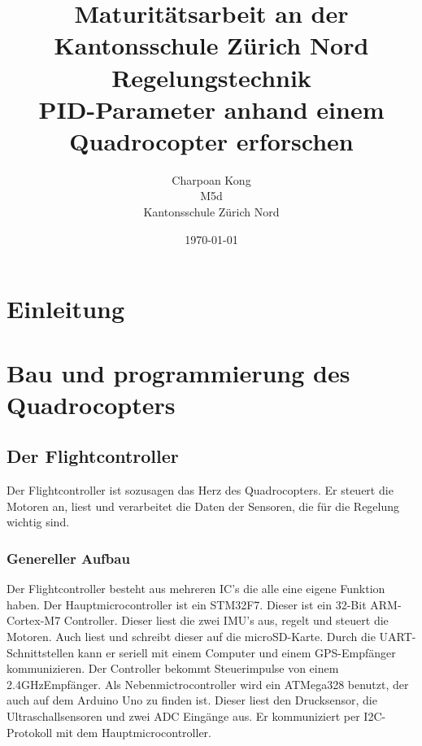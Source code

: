 \documentclass[12pt,a4paper, ngerman]{article}
\begin{document}

\title{\large Maturitätsarbeit an der Kantonsschule Zürich Nord \\ \Huge Regelungstechnik \\ \huge PID-Parameter anhand einem Quadrocopter erforschen}
\date{\today}
\author{Charpoan Kong \\ M5d \\ Kantonsschule Zürich Nord}
\maketitle
{}

\newpage
\clearpage
{}
\tableofcontents
\newpage
{}

\section{Einleitung}

\newpage
\section{Bau und programmierung des Quadrocopters}
\subsection{Der Flightcontroller}
Der Flightcontroller ist sozusagen das Herz des Quadrocopters. Er steuert die Motoren an, liest und verarbeitet die Daten der Sensoren, die für die Regelung wichtig sind.
\subsubsection{Genereller Aufbau}
Der Flightcontroller besteht aus mehreren IC's die alle eine eigene Funktion haben. Der Hauptmicrocontroller ist ein STM32F7. Dieser ist ein 32-Bit ARM-Cortex-M7 Controller. Dieser liest die zwei IMU's aus, regelt und steuert die Motoren. Auch liest und schreibt dieser auf die microSD-Karte. Durch die UART-Schnittstellen kann er seriell mit einem Computer und einem GPS-Empfänger kommunizieren. Der Controller bekommt Steuerimpulse von einem 2.4GHzEmpfänger. Als Nebenmictrocontroller wird ein ATMega328 benutzt, der auch auf dem Arduino Uno zu finden ist. Dieser liest den Drucksensor, die Ultraschallsensoren und zwei ADC Eingänge aus. Er kommuniziert per I2C-Protokoll mit dem Hauptmicrocontroller.
\end{document}
